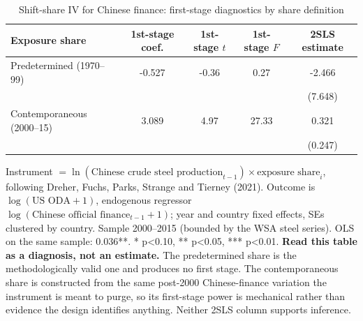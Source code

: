 \begin{table}[htbp]
\centering
\caption{Shift-share IV for Chinese finance: first-stage diagnostics by share definition}
\label{tab:iv}
\small
\begin{tabular}{lcccc}
\toprule
Exposure share & 1st-stage coef. & 1st-stage $t$ & 1st-stage $F$ & 2SLS estimate \\
\midrule
Predetermined (1970--99) & -0.527 & -0.36 & 0.27 & -2.466 \\
 & & & & (7.648) \\[2pt]
Contemporaneous (2000--15) & 3.089 & 4.97 & 27.33 & 0.321 \\
 & & & & (0.247) \\[2pt]
\bottomrule
\end{tabular}
\begin{minipage}{0.92\textwidth}
\vspace{4pt}
\footnotesize Instrument $=\ln(\text{Chinese crude steel production}_{t-1})\times\text{exposure share}_i$,
following Dreher, Fuchs, Parks, Strange and Tierney (2021). Outcome is $\log(\text{US ODA}+1)$,
endogenous regressor $\log(\text{Chinese official finance}_{t-1}+1)$; year and country fixed
effects, SEs clustered by country. Sample 2000--2015 (bounded by the WSA steel series).
OLS on the same sample: $0.036$**. * p<0.10, ** p<0.05, *** p<0.01.
\textbf{Read this table as a diagnosis, not an estimate.} The predetermined share is the
methodologically valid one and produces no first stage. The contemporaneous share is
constructed from the same post-2000 Chinese-finance variation the instrument is meant to
purge, so its first-stage power is mechanical rather than evidence the design identifies
anything. Neither 2SLS column supports inference.
\end{minipage}
\end{table}
